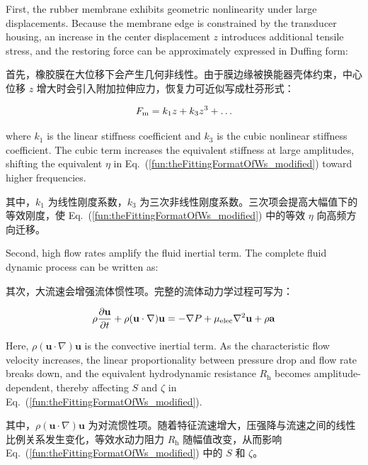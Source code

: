 \documentclass[sn-nature]{sn-jnl}
\newif\ifCNENEnglish
\newif\ifCNENBilingual
\newcommand{\CNEN}[2]{%
    \ifCNENBilingual
        #1%
        \if\relax\detokenize{#2}\relax\else\par #2\fi%
    \else
        \ifCNENEnglish
            #2%
        \else
            #1%
        \fi
    \fi
}
\newcommand{\fn}{\eta} %
\newcommand{\Sen}{S} %
\begin{document}
\CNEN{首先，橡胶膜在大位移下会产生几何非线性。由于膜边缘被换能器壳体约束，中心位移 $z$ 增大时会引入附加拉伸应力，恢复力可近似写成杜芬形式：}{First, the rubber membrane exhibits geometric nonlinearity under large displacements. Because the membrane edge is constrained by the transducer housing, an increase in the center displacement $z$ introduces additional tensile stress, and the restoring force can be approximately expressed in Duffing form:%
}
\begin{equation}
    F_{\rm m} = k_1 z + k_3 z^3 + \dots
    \label{eq:duffing_nonlinear}
\end{equation}
\CNEN{其中，$k_1$ 为线性刚度系数，$k_3$ 为三次非线性刚度系数。三次项会提高大幅值下的等效刚度，使 Eq.~(\ref{fun:theFittingFormatOfWs_modified}) 中的等效 $\fn$ 向高频方向迁移。}{where $k_1$ is the linear stiffness coefficient and $k_3$ is the cubic nonlinear stiffness coefficient. The cubic term increases the equivalent stiffness at large amplitudes, shifting the equivalent $\fn$ in Eq.~(\ref{fun:theFittingFormatOfWs_modified}) toward higher frequencies.%
}

\CNEN{其次，大流速会增强流体惯性项。完整的流体动力学过程可写为：}{Second, high flow rates amplify the fluid inertial term. The complete fluid dynamic process can be written as:%
}
\begin{equation}
    \rho \frac{\partial \mathbf{u}}{\partial t}
    + \rho(\mathbf{u}\cdot\nabla)\mathbf{u}
    = -\nabla P + \mu_{\rm elec}\nabla^2\mathbf{u} + \rho\mathbf{a}
    \label{eq:navier_stokes_full}
\end{equation}
\CNEN{其中，$\rho(\mathbf{u}\cdot\nabla)\mathbf{u}$ 为对流惯性项。随着特征流速增大，压强降与流速之间的线性比例关系发生变化，等效水动力阻力 $R_{\text{h}}$ 随幅值改变，从而影响 Eq.~(\ref{fun:theFittingFormatOfWs_modified}) 中的 $\Sen$ 和 $\zeta$。}{
Here, $\rho(\mathbf{u}\cdot\nabla)\mathbf{u}$ is the convective inertial term. As the characteristic flow velocity increases, the linear proportionality between pressure drop and flow rate breaks down, and the equivalent hydrodynamic resistance $R_{\text{h}}$ becomes amplitude-dependent, thereby affecting $\Sen$ and $\zeta$ in Eq.~(\ref{fun:theFittingFormatOfWs_modified}).%
}
\end{document}
